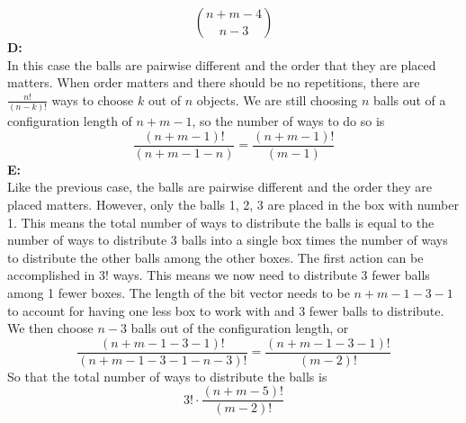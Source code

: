 \documentclass[12pt,letterpaper]{cos340hw}
\begin{document}
$$\binom{n+m-4}{n-3}$$
\noindent\textbf{D:}\\
In this case the balls are pairwise different and the order that they are placed matters. When order matters and there should be no repetitions, 
there are $\frac{n!}{(n-k)!}$ ways to choose $k$ out of $n$ objects. We are still choosing $n$ balls out of a configuration length of $n+m-1$, 
so the number of ways to do so is
$$\frac{(n+m-1)!}{(n+m-1-n)}=\frac{(n+m-1)!}{(m-1)}$$
\noindent\textbf{E:}\\
Like the previous case, the balls are pairwise different and the order they are placed matters. However,  only the balls 1, 2, 3 are placed in 
the box with number 1. This means the total number of ways to distribute the balls is equal to the number of ways to distribute 3 balls into a 
single box times the number of ways to distribute the other balls among the other boxes. The first action can be accomplished in $3!$ ways. 
This means we now need to distribute 3 fewer balls among 1 fewer boxes. The length of the bit vector needs to be $n+m-1-3-1$ to account for 
having one less box to work with and 3 fewer balls to distribute. We then choose $n-3$ balls out of the configuration length, or
$$\frac{(n+m-1-3-1)!}{(n+m-1-3-1-n-3)!}=\frac{(n+m-1-3-1)!}{(m-2)!}$$
So that the total number of ways to distribute the balls is
$$3!\cdot\frac{(n+m-5)!}{(m-2)!}$$

\end{document}
